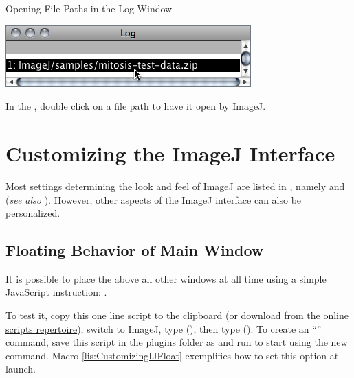 \begin{infobox}
\caption{\label{infobox:Log-window-pathfile}Opening File Paths in the Log
Window}


\begin{minipage}[c][1\totalheight][t]{0.52\columnwidth}%
\noindent \includegraphics[scale=0.55]{images/LogWindow2}%
\end{minipage}%
\begin{minipage}[c][1\totalheight][t]{0.48\columnwidth}%
\noindent In the , double click on a file
path to have it open by ImageJ.%
\end{minipage} 
\end{infobox}



\section{Customizing the ImageJ Interface\label{sec:GUIcustomization}}

Most settings determining the look and feel of ImageJ are listed in
, namely 
and 
(\emph{see also} ). However,
other aspects of the ImageJ interface can also be personalized.


\subsection{Floating Behavior of Main Window\label{sub:FloatingMainWin}}

It is possible to place the  above
all other windows at all time using a simple JavaScript instruction:
.

To test it, copy this one line script to the clipboard (or download
from the online \href{http://imagej.nih.gov/ij/macros/js/}{scripts repertoire}),
switch to ImageJ, type   (),
then type   ().
To create an ``'' command, save this
script in the plugins folder as 
and run 
to start using the new command. Macro \eqref{lis:CustomizingIJFloat}
 exemplifies how to set this option
at launch. 


